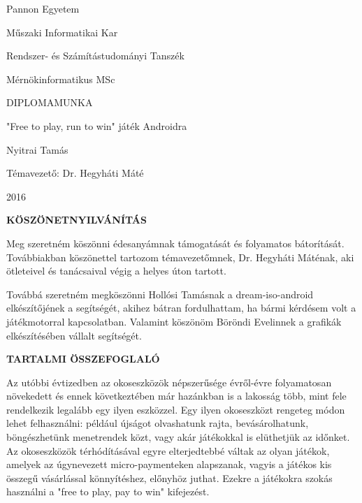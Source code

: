 \documentclass[a4paper,oneside,10pt]{report}
\begin{document}
\begin{titlepage}
\begin{center}
\Large
Pannon Egyetem

\vspace{10mm}
Műszaki Informatikai Kar

\vspace{10mm}
Rendszer- és Számítástudományi Tanszék

\vspace{10mm}
Mérnökinformatikus MSc

\vspace{40mm}
\huge
DIPLOMAMUNKA

\vspace{10mm}
\LARGE
"Free to play, run to win" játék Androidra

\vspace{10mm}
\Large
Nyitrai Tamás

\vspace{40mm}
Témavezető: Dr. Hegyháti Máté

\vspace{10mm}
2016
\normalsize
\end{center}
\end{titlepage}



\pagestyle{empty} %



\newpage
\Large
\begin{center}
	\textbf{KÖSZÖNETNYILVÁNÍTÁS}
\end{center}
\normalsize
\noindent
Meg szeretném köszönni édesanyámnak támogatását és folyamatos bátorítását. Továbbiakban köszönettel tartozom témavezetőmnek, Dr. Hegyháti Máténak, aki ötleteivel és tanácsaival végig a helyes úton tartott.

Továbbá szeretném megköszönni Hollósi Tamásnak a dream-iso-android elkészítőjének a segítségét, akihez bátran fordulhattam, ha bármi kérdésem volt a játékmotorral kapcsolatban. Valamint köszönöm Böröndi Evelinnek a grafikák elkészítésében vállalt segítségét.
\newpage
\Large
\begin{center}
	\textbf{TARTALMI ÖSSZEFOGLALÓ}
\end{center}
\normalsize
\noindent

Az utóbbi évtizedben az okoseszközök népszerűsége évről-évre folyamatosan növekedett és ennek következtében már hazánkban is a lakosság több, mint fele rendelkezik legalább egy ilyen eszközzel. 
Egy ilyen okoseszközt rengeteg módon lehet felhasználni: például újságot olvashatunk rajta, bevásárolhatunk, böngészhetünk menetrendek közt, vagy akár játékokkal is elüthetjük az időnket. 
Az okoseszközök térhódításával egyre elterjedtebbé váltak az olyan játékok, amelyek az úgynevezett micro-paymenteken alapszanak, vagyis a játékos kis összegű vásárlással könnyítéshez, előnyhöz juthat. Ezekre a játékokra szokás használni a "free to play, pay to win" kifejezést.
\end{document}

